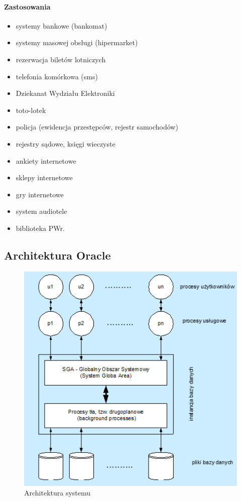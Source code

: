 \documentclass[]{report}
\begin{document}
\paragraph{Zastosowania}

\begin{itemize}
\item systemy bankowe (bankomat)
\item systemy masowej obsługi (hipermarket)
\item rezerwacja biletów lotniczych
\item telefonia komórkowa (sms)
\item Dziekanat Wydziału Elektroniki
\item toto-lotek
\item policja (ewidencja przestępców, rejestr samochodów)
\item rejestry sądowe, księgi wieczyste
\item ankiety internetowe
\item sklepy internetowe
\item gry internetowe
\item system audiotele
\item biblioteka PWr.

\end{itemize}


\subsection{Architektura Oracle}

\begin{figure}[htbp]
\centering
\includegraphics[scale=0.7]{obrazy/archoracle.png}
\caption{Architektura systemu}
\end{figure}
\end{document}
